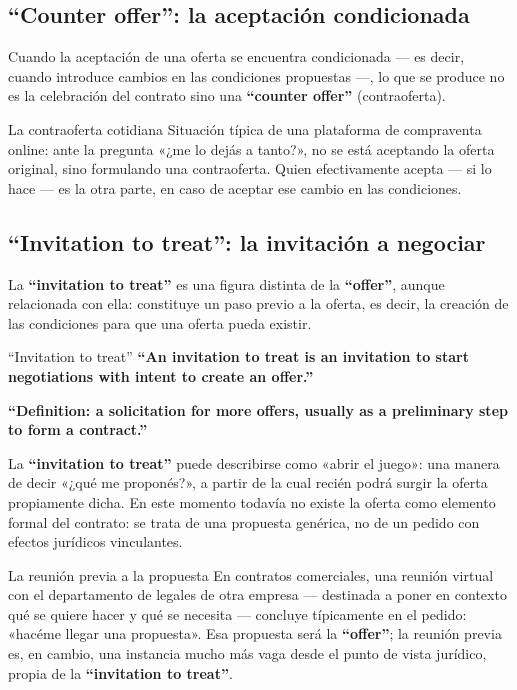 \documentclass[12pt,oneside]{book}
\begin{document}
\subsection{\texorpdfstring{``Counter offer'': la aceptación condicionada}{Counter offer: la aceptación condicionada}}

Cuando la aceptación de una oferta se encuentra condicionada --- es decir, cuando introduce cambios en las condiciones propuestas ---, lo que se produce no es la celebración del contrato sino una \textbf{``counter offer''} (contraoferta).

\begin{example}{La contraoferta cotidiana}
Situación típica de una plataforma de compraventa online: ante la pregunta «¿me lo dejás a tanto?», no se está aceptando la oferta original, sino formulando una contraoferta. Quien efectivamente acepta --- si lo hace --- es la otra parte, en caso de aceptar ese cambio en las condiciones.
\end{example}

\subsection{\texorpdfstring{``Invitation to treat'': la invitación a negociar}{Invitation to treat: la invitación a negociar}}

La \textbf{``invitation to treat''} es una figura distinta de la \textbf{``offer''}, aunque relacionada con ella: constituye un paso previo a la oferta, es decir, la creación de las condiciones para que una oferta pueda existir.

\begin{definition}{``Invitation to treat''}
\textbf{``An invitation to treat is an invitation to start negotiations with intent to create an offer.''}

\textbf{``Definition: a solicitation for more offers, usually as a preliminary step to form a contract.''}
\end{definition}

La \textbf{``invitation to treat''} puede describirse como «abrir el juego»: una manera de decir «¿qué me proponés?», a partir de la cual recién podrá surgir la oferta propiamente dicha. En este momento todavía no existe la oferta como elemento formal del contrato: se trata de una propuesta genérica, no de un pedido con efectos jurídicos vinculantes.

\begin{example}{La reunión previa a la propuesta}
En contratos comerciales, una reunión virtual con el departamento de legales de otra empresa --- destinada a poner en contexto qué se quiere hacer y qué se necesita --- concluye típicamente en el pedido: «hacéme llegar una propuesta». Esa propuesta será la \textbf{``offer''}; la reunión previa es, en cambio, una instancia mucho más vaga desde el punto de vista jurídico, propia de la \textbf{``invitation to treat''}.
\end{example}
\end{document}
